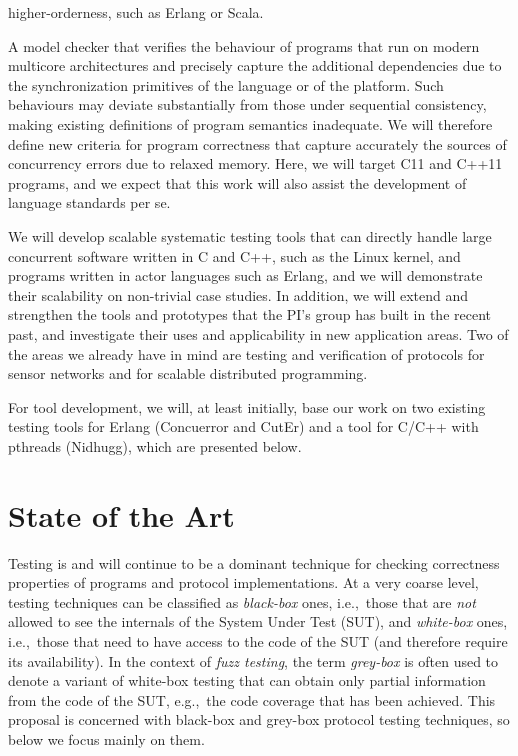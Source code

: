 \documentclass[11pt]{article}
\newcommand{\system}[1]{\mbox{\textsf{#1}}}
\newcommand{\eg}{e.\/g.,\ }
\newcommand{\ie}{i.\/e.,\ }
\begin{document}
{\begin{description}
\begin{inparaenum}[(i)]
      higher-orderness, such as Erlang or Scala.
    \item A model checker that verifies the behaviour of programs that
      run on modern multicore architectures and precisely capture the
      additional dependencies due to the synchronization primitives of
      the language or of the platform. Such behaviours may deviate
      substantially from those under sequential consistency, making
      existing definitions of program semantics inadequate. We will
      therefore define new criteria for program correctness that
      capture accurately the sources of concurrency errors due to
      relaxed memory. Here, we will target C11 and C++11 programs, and
      we expect that this work will also assist the development of
      language standards per se.
  \end{inparaenum}
\item[Tools and Case Studies.] We will develop scalable systematic testing
  tools that can directly handle large concurrent software written in C and
  C++, such as the Linux kernel, and programs written in actor languages
  such as Erlang, and we will demonstrate their scalability on non-trivial
  case studies. In addition, we will extend and strengthen the tools and
  prototypes that the PI's group has built in the recent past, and
  investigate their uses and applicability in new application areas. Two of
  the areas we already have in mind are testing and verification of
  protocols for sensor networks
  and for scalable distributed programming.
\end{description}

For tool development, we will, at least initially, base our work on
two existing testing tools for Erlang (\system{Concuerror} and
\system{CutEr}) and a tool for C/C++ with pthreads (\system{Nidhugg}),
which are presented below.
}

\section{State of the Art}
Testing is and will continue to be a dominant technique for checking
correctness properties of programs and protocol implementations.  At a very
coarse level, testing techniques can be classified as \emph{black-box} ones,
\ie those that are \emph{not} allowed to see the internals of the System Under
Test (SUT), and \emph{white-box} ones, \ie those that need to have access to
the code of the SUT (and therefore require its availability).  In the context
of \emph{fuzz testing}, the term \emph{grey-box} is often used to denote a
variant of white-box testing that can obtain only partial information from the
code of the SUT, \eg the code coverage that has been achieved.
%
This proposal is concerned with black-box and grey-box protocol testing
techniques, so below we focus mainly on them.
\end{document}
